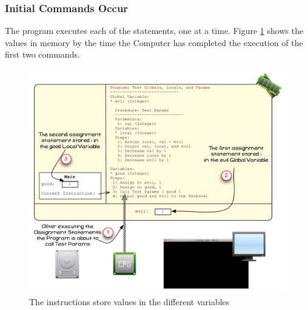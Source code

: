\subsubsection{Initial Commands Occur} %
\label{ssub:initial_commands_occur}

The program executes each of the statements, one at a time. Figure \ref{fig:vis-globals-3} shows the values in memory by the time the Computer has completed the execution of the first two commands.

\begin{figure}[htbp]
   \centering
   \includegraphics[width=\textwidth]{./topics/storing-using-data/images/vis-globals-3} 
   \caption{The instructions store values in the different variables}
   \label{fig:vis-globals-3}
\end{figure}


